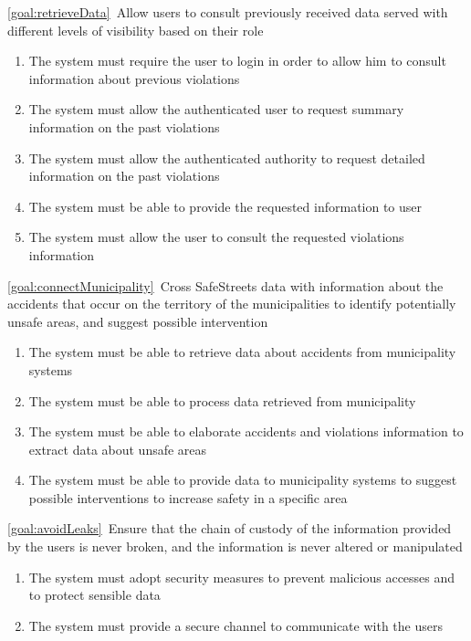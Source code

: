 \begin{description}
\begin{enumerate}[resume*]
   			\end{enumerate}
		\item \ref{goal:retrieveData}\ Allow users to consult previously received data served with different levels of visibility based on their role
			\begin{enumerate}[resume*]
   				\item The system must require the user to login in order to allow him to consult information about previous violations
   				\item The system must allow the authenticated user to request summary information on the past violations
   				\item The system must allow the authenticated authority to request detailed information on the past violations
   				\item The system must be able to provide the requested information to user
   				\item The system must allow the user to consult the requested violations information
  			\end{enumerate}
		\item \ref{goal:connectMunicipality}\ Cross SafeStreets data with information about the accidents that occur on the territory of the municipalities to identify potentially unsafe areas, and suggest possible intervention
			\begin{enumerate}[resume*]
   				\item The system must be able to retrieve data about accidents from municipality systems 
   				\item The system must be able to process data retrieved from municipality
   				\item The system must be able to elaborate accidents and violations information to extract data about unsafe areas
   				\item The system must be able to provide data to municipality systems to suggest possible interventions to increase safety in a specific area
  			\end{enumerate}
  		\item \ref{goal:avoidLeaks}\ Ensure that the chain of custody of the information provided by the users is never broken, and the information is never altered or manipulated
  			\begin{enumerate}[resume*]
  				\item The system must adopt security measures to prevent malicious accesses and to protect sensible data
   				\item The system must provide a secure channel to communicate with the users

\end{enumerate}
\end{description}
